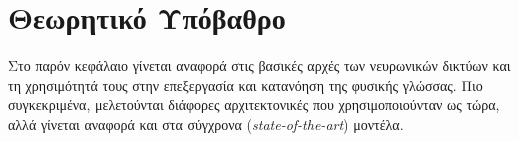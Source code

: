 \chapter{Θεωρητικό Υπόβαθρο}
\label{chapter:theory}
Στο παρόν κεφάλαιο γίνεται αναφορά στις βασικές αρχές των νευρωνικών δικτύων και τη χρησιμότητά τους στην επεξεργασία και κατανόηση της φυσικής γλώσσας. Πιο συγκεκριμένα, μελετούνται διάφορες αρχιτεκτονικές που χρησιμοποιούνταν ως τώρα, αλλά γίνεται αναφορά και στα σύγχρονα (\emph{state-of-the-art}) μοντέλα.







